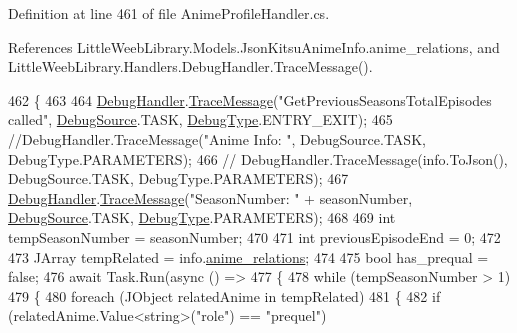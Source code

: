 Definition at line 461 of file Anime\+Profile\+Handler.\+cs.



References Little\+Weeb\+Library.\+Models.\+Json\+Kitsu\+Anime\+Info.\+anime\+\_\+relations, and Little\+Weeb\+Library.\+Handlers.\+Debug\+Handler.\+Trace\+Message().


\begin{DoxyCode}
462         \{
463 
464             \mbox{\hyperlink{class_little_weeb_library_1_1_handlers_1_1_anime_profile_handler_a0b0ae3c3838d26351485e6dfc566a632}{DebugHandler}}.\mbox{\hyperlink{interface_little_weeb_library_1_1_handlers_1_1_i_debug_handler_a2e405bc3492e683cd3702fae125221bc}{TraceMessage}}(\textcolor{stringliteral}{"GetPreviousSeasonsTotalEpisodes called"}, 
      \mbox{\hyperlink{namespace_little_weeb_library_1_1_handlers_a2a6ca0775121c9c503d58aa254d292be}{DebugSource}}.TASK, \mbox{\hyperlink{namespace_little_weeb_library_1_1_handlers_ab66019ed40462876ec4e61bb3ccb0a62}{DebugType}}.ENTRY\_EXIT);
465             \textcolor{comment}{//DebugHandler.TraceMessage("Anime Info: ", DebugSource.TASK, DebugType.PARAMETERS);}
466            \textcolor{comment}{// DebugHandler.TraceMessage(info.ToJson(), DebugSource.TASK, DebugType.PARAMETERS);}
467             \mbox{\hyperlink{class_little_weeb_library_1_1_handlers_1_1_anime_profile_handler_a0b0ae3c3838d26351485e6dfc566a632}{DebugHandler}}.\mbox{\hyperlink{interface_little_weeb_library_1_1_handlers_1_1_i_debug_handler_a2e405bc3492e683cd3702fae125221bc}{TraceMessage}}(\textcolor{stringliteral}{"SeasonNumber: "} + seasonNumber, 
      \mbox{\hyperlink{namespace_little_weeb_library_1_1_handlers_a2a6ca0775121c9c503d58aa254d292be}{DebugSource}}.TASK, \mbox{\hyperlink{namespace_little_weeb_library_1_1_handlers_ab66019ed40462876ec4e61bb3ccb0a62}{DebugType}}.PARAMETERS);
468 
469             \textcolor{keywordtype}{int} tempSeasonNumber = seasonNumber;
470 
471             \textcolor{keywordtype}{int} previousEpisodeEnd = 0;
472 
473             JArray tempRelated = info.\mbox{\hyperlink{class_little_weeb_library_1_1_models_1_1_json_kitsu_anime_info_a8df2cf3af93654bd0362985dfd3208e0}{anime\_relations}};
474 
475             \textcolor{keywordtype}{bool} has\_prequal = \textcolor{keyword}{false};
476             await Task.Run(async () =>
477             \{
478                 \textcolor{keywordflow}{while} (tempSeasonNumber > 1)
479                 \{
480                     \textcolor{keywordflow}{foreach} (JObject relatedAnime \textcolor{keywordflow}{in} tempRelated)
481                     \{
482                         \textcolor{keywordflow}{if} (relatedAnime.Value<\textcolor{keywordtype}{string}>(\textcolor{stringliteral}{"role"}) == \textcolor{stringliteral}{"prequel"})

\end{DoxyCode}
